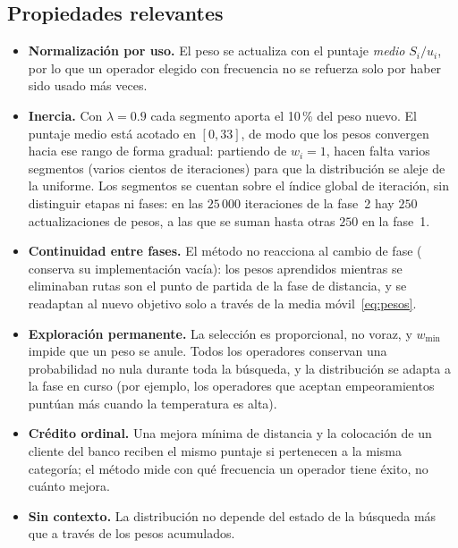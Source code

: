\subsection{Propiedades relevantes}

\begin{itemize}
\item \textbf{Normalización por uso.} El peso se actualiza con el puntaje \emph{medio}
$S_i/u_i$, por lo que un operador elegido con frecuencia no se refuerza solo por haber sido
usado más veces.
\item \textbf{Inercia.} Con $\lambda=0.9$ cada segmento aporta el 10\,\% del peso nuevo. El
puntaje medio está acotado en $[0,33]$, de modo que los pesos convergen hacia ese rango de
forma gradual: partiendo de $w_i=1$, hacen falta varios segmentos (varios cientos de
iteraciones) para que la distribución se aleje de la uniforme. Los segmentos se cuentan
sobre el índice global de iteración, sin distinguir etapas ni fases: en las $25\,000$
iteraciones de la fase~2 hay $250$ actualizaciones de pesos, a las que se suman hasta otras
$250$ en la fase~1.
\item \textbf{Continuidad entre fases.} El método no reacciona al cambio de fase
( conserva su implementación vacía): los pesos aprendidos mientras se
eliminaban rutas son el punto de partida de la fase de distancia, y se readaptan al nuevo
objetivo solo a través de la media móvil~\eqref{eq:pesos}.
\item \textbf{Exploración permanente.} La selección es proporcional, no voraz, y $w_{\min}$
impide que un peso se anule. Todos los operadores conservan una probabilidad no nula durante
toda la búsqueda, y la distribución se adapta a la fase en curso (por ejemplo, los operadores
que aceptan empeoramientos puntúan más cuando la temperatura es alta).
\item \textbf{Crédito ordinal.} Una mejora mínima de distancia y la colocación de un cliente
del banco reciben el mismo puntaje si pertenecen a la misma categoría; el método mide con qué frecuencia
un operador tiene éxito, no cuánto mejora.
\item \textbf{Sin contexto.} La distribución no depende del estado de la búsqueda más que a
través de los pesos acumulados.
\end{itemize}
